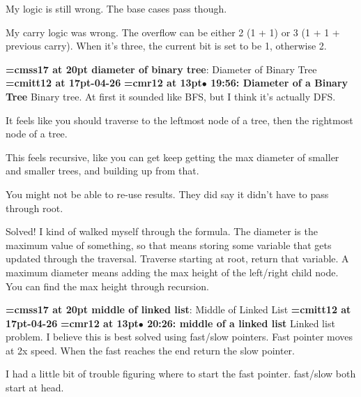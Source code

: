 My logic is still wrong. The base cases pass though.
\par

My carry logic was wrong. The overflow can be either 2 (1 + 1) or 3 (1 + 1 + previous carry). When it's three, the current bit is set to be 1, otherwise 2.
\par

{\medskip\noindent\bf\font\titlefont=cmss17 at 20pt diameter of binary tree}: Diameter of Binary Tree
{\medskip\noindent\bf\font\titlefont=cmitt12 at 17pt-04-26}\medskip
{\smallskip\noindent\bf\font\titlefont=cmr12 at 13pt\titlefont $\bullet$ 19:56: Diameter of a Binary Tree}\smallskip
Binary tree. At first it sounded like BFS, but I think it's actually DFS.
\par

It feels like you should traverse to the leftmost node of a tree, then the rightmost node of a tree.
\par

This feels recursive, like you can get keep getting the max diameter of smaller and smaller trees, and building up from that.
\par

You might not be able to re-use results. They did say it didn't have to pass through root.
\par

Solved! I kind of walked myself through the formula. The diameter is the maximum value of something, so that means storing some variable that gets updated through the traversal. Traverse starting at root, return that variable. A maximum diameter means adding the max height of the left/right child node. You can find the max height through recursion.
\par

{\medskip\noindent\bf\font\titlefont=cmss17 at 20pt middle of linked list}: Middle of Linked List
{\medskip\noindent\bf\font\titlefont=cmitt12 at 17pt-04-26}\medskip
{\smallskip\noindent\bf\font\titlefont=cmr12 at 13pt\titlefont $\bullet$ 20:26: middle of a linked list}\smallskip
Linked list problem. I believe this is best solved using fast/slow pointers. Fast pointer moves at 2x speed. When the fast reaches the end return the slow pointer.
\par

I had a little bit of trouble figuring where to start the fast pointer. fast/slow both start at head.
\par

